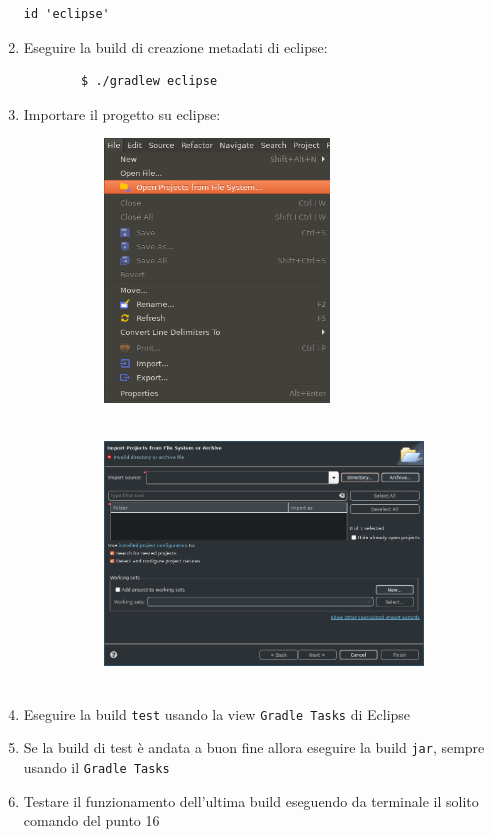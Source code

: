 \begin{enumerate}
\begin{lstlisting}[frame=single]
    id 'eclipse'
    \end{lstlisting}
    \item Eseguire la build di creazione metadati di eclipse:
    \begin{verbatim}
        $ ./gradlew eclipse \end{verbatim}
    \item Importare il progetto su eclipse:
    \begin{figure}[H]
        \begin{subfigure}{0.5\textwidth}
        \includegraphics[width=1.0\linewidth, height=7cm]{3DependencyManagement/tutorial/importProject.png}
        \end{subfigure}
        \begin{subfigure}{0.5\textwidth}
        \includegraphics[width=1.0\linewidth, height=7cm]{3DependencyManagement/tutorial/importSource.png}
        \end{subfigure}
    \end{figure}
    \item Eseguire la build \texttt{test} usando la view \texttt{Gradle Tasks} di Eclipse
    \item Se la build di test è andata a buon fine allora eseguire la build \texttt{jar}, sempre usando il \texttt{Gradle Tasks}
    \item Testare il funzionamento dell'ultima build eseguendo da terminale il solito comando del punto 16
\end{enumerate}